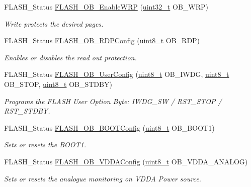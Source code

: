 \begin{DoxyCompactItemize}
F\-L\-A\-S\-H\-\_\-\-Status \hyperlink{group___f_l_a_s_h___group3_gaceab6d803f000ce912887a09819e2e8e}{F\-L\-A\-S\-H\-\_\-\-O\-B\-\_\-\-Enable\-W\-R\-P} (\hyperlink{stdint_8h_a435d1572bf3f880d55459d9805097f62}{uint32\-\_\-t} O\-B\-\_\-\-W\-R\-P)
\begin{DoxyCompactList}\small\item\em Write protects the desired pages. \end{DoxyCompactList}\item 
F\-L\-A\-S\-H\-\_\-\-Status \hyperlink{group___f_l_a_s_h___group3_ga594868298deb5fce8591c4d098f8a4d0}{F\-L\-A\-S\-H\-\_\-\-O\-B\-\_\-\-R\-D\-P\-Config} (\hyperlink{stdint_8h_aba7bc1797add20fe3efdf37ced1182c5}{uint8\-\_\-t} O\-B\-\_\-\-R\-D\-P)
\begin{DoxyCompactList}\small\item\em Enables or disables the read out protection. \end{DoxyCompactList}\item 
F\-L\-A\-S\-H\-\_\-\-Status \hyperlink{group___f_l_a_s_h___group3_gaebff8201c09c0d15d997c5caee7e802b}{F\-L\-A\-S\-H\-\_\-\-O\-B\-\_\-\-User\-Config} (\hyperlink{stdint_8h_aba7bc1797add20fe3efdf37ced1182c5}{uint8\-\_\-t} O\-B\-\_\-\-I\-W\-D\-G, \hyperlink{stdint_8h_aba7bc1797add20fe3efdf37ced1182c5}{uint8\-\_\-t} O\-B\-\_\-\-S\-T\-O\-P, \hyperlink{stdint_8h_aba7bc1797add20fe3efdf37ced1182c5}{uint8\-\_\-t} O\-B\-\_\-\-S\-T\-D\-B\-Y)
\begin{DoxyCompactList}\small\item\em Programs the F\-L\-A\-S\-H User Option Byte\-: I\-W\-D\-G\-\_\-\-S\-W / R\-S\-T\-\_\-\-S\-T\-O\-P / R\-S\-T\-\_\-\-S\-T\-D\-B\-Y. \end{DoxyCompactList}\item 
F\-L\-A\-S\-H\-\_\-\-Status \hyperlink{group___f_l_a_s_h___group3_ga9e95fb5822536312dd1f0ed32ee43ad3}{F\-L\-A\-S\-H\-\_\-\-O\-B\-\_\-\-B\-O\-O\-T\-Config} (\hyperlink{stdint_8h_aba7bc1797add20fe3efdf37ced1182c5}{uint8\-\_\-t} O\-B\-\_\-\-B\-O\-O\-T1)
\begin{DoxyCompactList}\small\item\em Sets or resets the B\-O\-O\-T1. \end{DoxyCompactList}\item 
F\-L\-A\-S\-H\-\_\-\-Status \hyperlink{group___f_l_a_s_h___group3_ga91707dbdeb5cb08c8326c866de582ea1}{F\-L\-A\-S\-H\-\_\-\-O\-B\-\_\-\-V\-D\-D\-A\-Config} (\hyperlink{stdint_8h_aba7bc1797add20fe3efdf37ced1182c5}{uint8\-\_\-t} O\-B\-\_\-\-V\-D\-D\-A\-\_\-\-A\-N\-A\-L\-O\-G)
\begin{DoxyCompactList}\small\item\em Sets or resets the analogue monitoring on V\-D\-D\-A Power source. \end{DoxyCompactList}\item 

\end{DoxyCompactItemize}
